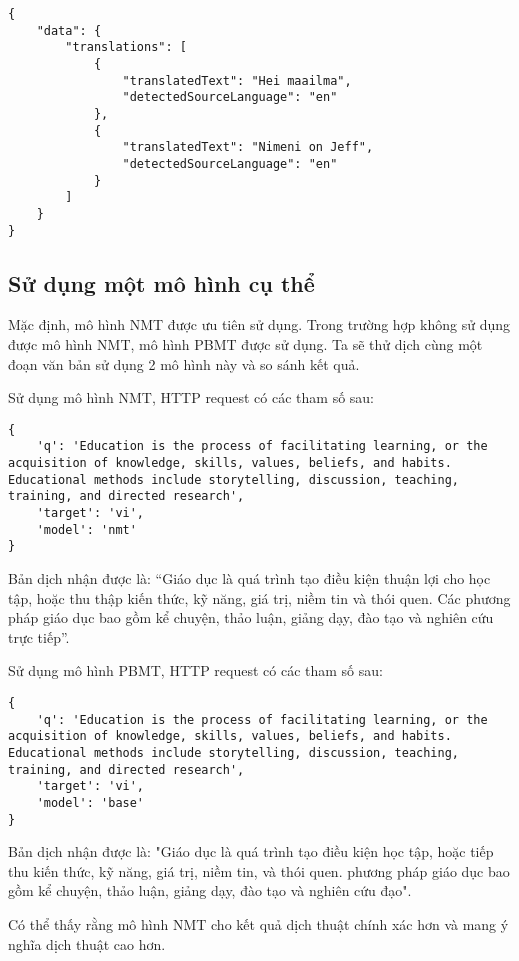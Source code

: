 \documentclass[../thesis.tex]{subfiles}
\begin{document}
\begin{lstlisting}[style=link]
{
	"data": {
		"translations": [
			{
				"translatedText": "Hei maailma",
				"detectedSourceLanguage": "en"
			},
			{
				"translatedText": "Nimeni on Jeff",
				"detectedSourceLanguage": "en"
			}
		]
	}
}
\end{lstlisting}

\subsection{Sử dụng một mô hình cụ thể}
Mặc định, mô hình NMT được ưu tiên sử dụng. Trong trường hợp không sử dụng được mô hình NMT, mô hình PBMT được sử dụng. Ta sẽ thử dịch cùng một đoạn văn bản sử dụng 2 mô hình này và so sánh kết quả.

Sử dụng mô hình NMT, HTTP request có các tham số sau:
\begin{lstlisting}[style=link]
{
	'q': 'Education is the process of facilitating learning, or the acquisition of knowledge, skills, values, beliefs, and habits. Educational methods include storytelling, discussion, teaching, training, and directed research',
	'target': 'vi',
	'model': 'nmt'
}
\end{lstlisting}

Bản dịch nhận được là: ``Giáo dục là quá trình tạo điều kiện thuận lợi cho học tập, hoặc thu thập kiến thức, kỹ năng, giá trị, niềm tin và thói quen. Các phương pháp giáo dục bao gồm kể chuyện, thảo luận, giảng dạy, đào tạo và nghiên cứu trực tiếp''.

Sử dụng mô hình PBMT, HTTP request có các tham số sau:
\begin{lstlisting}[style=link]
{
	'q': 'Education is the process of facilitating learning, or the acquisition of knowledge, skills, values, beliefs, and habits. Educational methods include storytelling, discussion, teaching, training, and directed research',
	'target': 'vi',
	'model': 'base'
}
\end{lstlisting}

Bản dịch nhận được là: "Giáo dục là quá trình tạo điều kiện học tập, hoặc tiếp thu kiến thức, kỹ năng, giá trị, niềm tin, và thói quen. phương pháp giáo dục bao gồm kể chuyện, thảo luận, giảng dạy, đào tạo và nghiên cứu đạo".

Có thể thấy rằng mô hình NMT cho kết quả dịch thuật chính xác hơn và mang ý nghĩa dịch thuật cao hơn.
\end{document}
